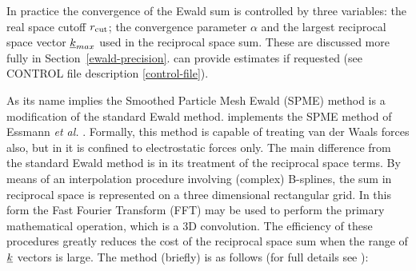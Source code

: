 In practice the convergence of the Ewald sum is controlled by
three variables: the real space cutoff $r_{\rm cut}$; the convergence
parameter $\alpha$ and the largest reciprocal space vector
$\mbox{$\underline{k}$}_{max}$ used in the reciprocal space sum.  These are
discussed more fully in Section~\ref{ewald-precision}.  \D can
provide estimates if requested (see CONTROL file description
\ref{control-file}).

As its name implies the Smoothed Particle Mesh Ewald (SPME)
 method is a modification of the standard Ewald
method.  \D implements the SPME method of Essmann {\em et al.}
\cite{essmann-95a}.  Formally, this method is capable of treating
van der Waals forces also, but in \D it is confined to
electrostatic forces only.  The main difference from the standard
Ewald method is in its treatment of the reciprocal space
terms.  By means of an interpolation procedure involving (complex)
B-splines, the sum in reciprocal space is represented on a three
dimensional rectangular grid.  In this form the Fast Fourier
Transform (FFT) may be used to perform the primary mathematical
operation, which is a 3D convolution.  The efficiency of these
procedures greatly reduces the cost of the reciprocal space sum
when the range of $\mbox{$\underline{k}$}$ vectors is large.  The method
(briefly) is as follows (for full details see \cite{essmann-95a}):

